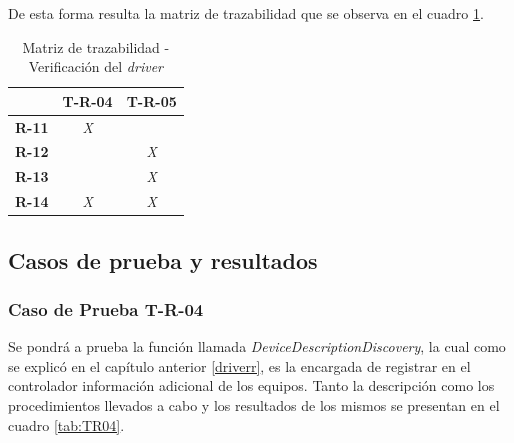 De esta forma resulta la matriz de trazabilidad que se observa en el cuadro \ref{tab:matriz_driver}.


\begin{table}[!h]
    \centering
    \begin{tabular}{|c|c|c|}
        \hline
        \textbf{}     & \textbf{T-R-04} & \textbf{T-R-05} \\ \hline
        \textbf{R-11} & \textit{X}      & \textit{}       \\ \hline
        \textbf{R-12} & \textit{}       & \textit{X}      \\ \hline
        \textbf{R-13} & \textit{}       & \textit{X}      \\ \hline
        \textbf{R-14} & \textit{X}      & \textit{X}      \\ \hline
        \end{tabular}
    \caption{Matriz de trazabilidad - Verificación del \textit{driver}}
    \label{tab:matriz_driver}
\end{table}

\subsection{Casos de prueba y resultados}

\subsubsection{Caso de Prueba T-R-04}

Se pondrá a prueba la función llamada \textit{DeviceDescriptionDiscovery}, la cual como se explicó en el capítulo anterior \ref{driverr}, es la encargada de registrar en el controlador información adicional de los equipos. Tanto la descripción como los procedimientos llevados a cabo y los resultados de los mismos se presentan en el cuadro \ref{tab:TR04}. 

